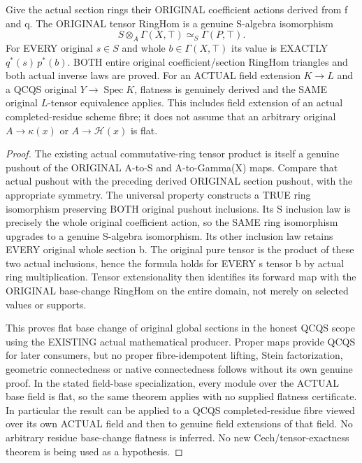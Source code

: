 \begin{theorem}
\label{scheme:actual-original-flat-global-section-tensor}
\leanok
{}
Give the actual section rings their ORIGINAL coefficient actions derived
from f and q. The ORIGINAL tensor RingHom is a genuine S-algebra
isomorphism
\[
 S\otimes_A\Gamma(X,\top)\simeq_S\Gamma(P,\top).
\]
For EVERY original $s\in S$ and whole $b\in\Gamma(X,\top)$ its value is
EXACTLY $q^*(s)\,p^*(b)$. BOTH entire original coefficient/section RingHom
triangles and both actual inverse laws are proved. For an ACTUAL field
extension $K\to L$ and a QCQS original $Y\to\operatorname{Spec}K$,
flatness is genuinely derived and the SAME original $L$-tensor equivalence
applies. This includes field extension of an actual completed-residue
scheme fibre; it does not assume that an arbitrary original
$A\to\kappa(x)$ or $A\to\mathcal H(x)$ is flat.
\end{theorem}
\begin{proof}
The existing actual commutative-ring tensor product is itself a genuine
pushout of the ORIGINAL A-to-S and A-to-Gamma(X) maps. Compare that actual
pushout with the preceding derived ORIGINAL section pushout, with the
appropriate symmetry. The universal property constructs a TRUE ring
isomorphism preserving BOTH original pushout inclusions. Its S inclusion
law is precisely the whole original coefficient action, so the SAME ring
isomorphism upgrades to a genuine S-algebra isomorphism. Its other inclusion
law retains EVERY original whole section b. The original pure tensor is
the product of these two actual inclusions, hence the formula holds for
EVERY s tensor b by actual ring multiplication. Tensor extensionality then
identifies its forward map with the ORIGINAL base-change RingHom on the
entire domain, not merely on selected values or supports.

This proves flat base change of original global sections in the honest
QCQS scope using the EXISTING actual mathematical producer. Proper maps
provide QCQS for later consumers, but no proper fibre-idempotent lifting,
Stein factorization, geometric connectedness or native connectedness follows
without its own genuine proof. In the stated field-base specialization,
every module over the ACTUAL base field is flat, so the same theorem
applies with no supplied flatness certificate. In particular the result
can be applied to a QCQS completed-residue fibre viewed over its own
ACTUAL field and then to genuine field extensions of that field.
No arbitrary residue base-change flatness is inferred.
No new Cech/tensor-exactness theorem is being
used as a hypothesis.
\end{proof}

